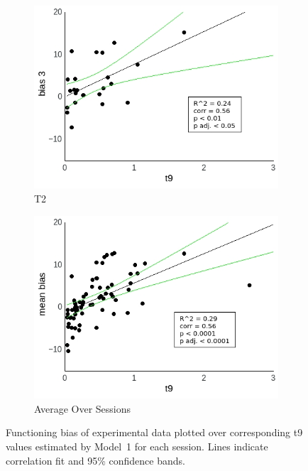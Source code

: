 \documentclass[a4paper]{scrreprt}
\begin{document}
\begin{figure}
\begin{subfigure}[b]{0.49\textwidth}
        \includegraphics[width=\textwidth]{figs/sec3/t9/t9_diff_3_mod1dat.jpeg}
        \caption{T2}
    \end{subfigure}
    \begin{subfigure}[b]{0.49\textwidth}
        \includegraphics[width=\textwidth]{figs/sec3/t9/t9_diff_mean_mod1dat.jpeg}
        \caption{Average Over Sessions}
    \end{subfigure}
\caption{Functioning bias of experimental data plotted over corresponding t9 values estimated by Model~1 for each session. Lines indicate correlation fit and 95\% confidence bands.}
\label{fig:t9_diff_mod1dat}
\end{figure}
\end{document}
